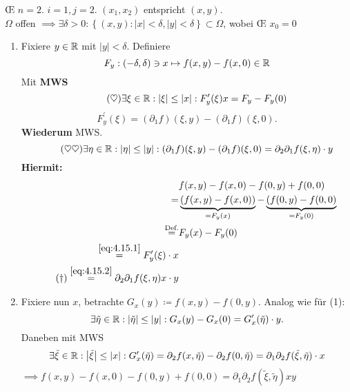 \begin{proof*}
	\OE{} $ n = 2 $. $ i = 1, j = 2 $.
	$ (x_1, x_2)  $ entspricht $ (x, y) $.\\
	$ \Omega $ offen $ \implies \exists \delta > 0 : \left\{ (x, y) : \left| x \right| < \delta, \left| y \right| < \delta \right\} \subset \Omega $, wobei \OE{} $ x_0 = 0 $
	\begin{enumerate}[label=(\arabic*)]
		\item Fixiere $ y \in \mathbb{R}  $ mit $ \left| y \right| < \delta $. Definiere
			\[
				F_y : (- \delta, \delta) \ni x \mapsto f(x, y) - f(x, 0) \in \mathbb{R} 
			\]
			Mit \textbf{MWS}
			\begin{equation}
				\label{eq:4.15.1}
				\tag{$\heartsuit$}
				\exists \xi \in \mathbb{R} : \left| \xi \right| \leq \left| x \right| : F_y^\prime (\xi) x = F_y - F_y(0)
			\end{equation}
			\[
				F_y^\prime (\xi) = (\partial_1 f) (\xi, y) - (\partial_1 f)(\xi, 0).
			\]
			\textbf{Wiederum} MWS.
			\begin{equation}
				\label{eq:4.15.2}
				\tag{$\heartsuit\heartsuit$}
				\exists \eta \in \mathbb{R} : \left| \eta \right| \leq \left| y \right| : (\partial_1 f)(\xi, y) - (\partial_1 f)(\xi, 0) = \partial_2\partial_1 f(\xi, \eta) \cdot y
			\end{equation}
			\textbf{Hiermit:}
			\begin{align*}
				~&f(x, y) - f(x, 0) - f(0, y) + f(0, 0) \\
				=& \underbrace{( f(x, y) - f(x, 0) )}_{=F_y(x)} - \underbrace{( f(0, y) - f(0, 0)}_{ = F_y(0)} \\
				\overset{\text{Def.} }{=} & F_y (x) - F_y(0) \\
				\overset{\eqref{eq:4.15.1}}{=} F_y^\prime (\xi) \cdot x\\
				\label{eq:4.15.3}
				\tag{\dag}
				\overset{\eqref{eq:4.15.2}}{=} \partial_2 \partial_1 f(\xi, \eta) x \cdot y
			\end{align*}
		\item Fixiere nun $ x $, betrachte $ G_x(y) \coloneqq  f(x, y) - f(0, y) $. Analog wie für (1):
			\[
				\exists \tilde \eta \in \mathbb{R} : \left| \tilde \eta \right| \leq  \left| y \right| : G_x (y) - G_x(0) = G_x^\prime (\tilde \eta) \cdot y.
			\]
			Daneben mit MWS
			\[
				\exists \tilde \xi \in \mathbb{R} : \left| \tilde \xi \right| \leq \left| x \right| : G_x^\prime (\tilde \eta) = \partial_2 f(x, \tilde \eta) - \partial_2 f(0, \tilde \eta) = \partial_1 \partial_2 f(\tilde \xi, \tilde \eta) \cdot x
			\]
			$ \implies f(x, y) - f(x, 0) - f(0, y) + f(0, 0) = \partial_1 \partial_2 f(\tilde \xi, \tilde \eta) xy $\\

\end{enumerate}
\end{proof*}
